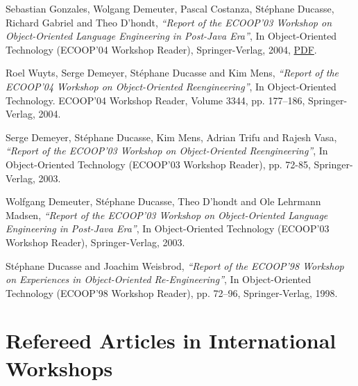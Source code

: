 \documentclass{article}
\newcommand{\czauthors}[1]{#1}
\newcommand{\cztitle}[1]{\emph{``#1''}}
\newcommand{\czbooktitle}[1]{#1}
\begin{document}
\begin{itemize}
	\pub  \czauthors{Sebastian Gonzales, Wolgang Demeuter, Pascal Costanza, St\'ephane Ducasse, Richard Gabriel and Theo D'hondt},  \cztitle{Report of the {ECOOP}'03 Workshop on Object-Oriented Language Engineering in Post-Java Era},  In \czbooktitle{Object-Oriented Technology (ECOOP'04 Workshop Reader)}, Springer-Verlag, 2004, \href{http://rmod-files.lille.inria.fr/Team/Texts/Papers//Gonz04a-oolepje04-report.pdf}{PDF}.

	\pub  \czauthors{Roel Wuyts, Serge Demeyer, St\'ephane Ducasse and Kim Mens},  \cztitle{Report of the {ECOOP}'04 Workshop on Object-Oriented Reengineering},  In \czbooktitle{Object-Oriented Technology. ECOOP'04 Workshop Reader}, Volume 3344, pp. 177--186, Springer-Verlag, 2004.

	\pub  \czauthors{Serge Demeyer, St\'ephane Ducasse, Kim Mens, Adrian Trifu and Rajesh Vasa},  \cztitle{Report of the {ECOOP}'03 Workshop on Object-Oriented Reengineering},  In \czbooktitle{Object-Oriented Technology (ECOOP'03 Workshop Reader)}, pp. 72-85, Springer-Verlag, 2003.

	\pub  \czauthors{Wolfgang Demeuter, St\'ephane Ducasse, Theo D'hondt and Ole Lehrmann Madsen},  \cztitle{Report of the {ECOOP}'03 Workshop on Object-Oriented Language Engineering in Post-Java Era},  In \czbooktitle{Object-Oriented Technology (ECOOP'03 Workshop Reader)}, Springer-Verlag, 2003.

	\pub  \czauthors{St\'ephane Ducasse and Joachim Weisbrod},  \cztitle{Report of the {ECOOP}'98 Workshop on Experiences in Object-Oriented Re-Engineering},  In \czbooktitle{Object-Oriented Technology (ECOOP'98 Workshop Reader)}, pp. 72--96, Springer-Verlag, 1998.

\end{itemize}\section{Refereed Articles in International Workshops}
\end{document}
